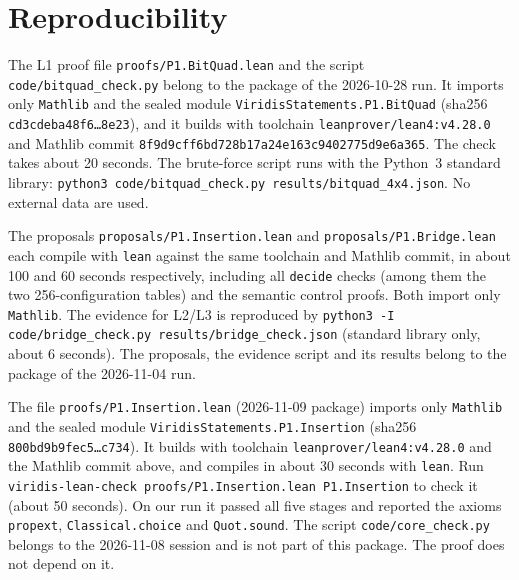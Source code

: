 \documentclass[11pt]{article}
\theoremstyle{definition}
\theoremstyle{remark}
\begin{document}
\section{Reproducibility}
{\sloppy

The L1 proof file \texttt{proofs/P1.BitQuad.lean} and the script
\texttt{code/bitquad\_check.py} belong to the package of the 2026-10-28 run. It imports only
\texttt{Mathlib} and the sealed module \texttt{ViridisStatements.P1.BitQuad}
(sha256 \texttt{cd3cdeba48f6\ldots{}8e23}), and it builds with toolchain
\texttt{leanprover/lean4:v4.28.0} and Mathlib commit
\texttt{8f9d9cff6bd728b17a24e163c9402775d9e6a365}. The check takes about 20
seconds. The brute-force script runs with the Python~3 standard library:
\texttt{python3 code/bitquad\_check.py results/bitquad\_4x4.json}. No external
data are used.

The proposals \texttt{proposals/P1.Insertion.lean} and
\texttt{proposals/P1.Bridge.lean} each compile with \texttt{lean} against the
same toolchain and Mathlib commit, in about 100 and 60 seconds respectively,
including all \texttt{decide} checks (among them the two 256-configuration
tables) and the semantic control proofs. Both import only \texttt{Mathlib}. The evidence
for L2/L3 is reproduced by \texttt{python3 -I code/bridge\_check.py
results/bridge\_check.json} (standard library only, about 6 seconds). The
proposals, the evidence script and its results belong to the package of the
2026-11-04 run.

The file \texttt{proofs/P1.Insertion.lean} (2026-11-09 package) imports only
\texttt{Mathlib} and the sealed module \texttt{ViridisStatements.P1.Insertion}
(sha256 \texttt{800bd9b9fec5\ldots{}c734}). It builds with toolchain
\texttt{leanprover/lean4:v4.28.0} and the Mathlib commit above, and compiles in about
30 seconds with \texttt{lean}. Run
\texttt{viridis-lean-check proofs/P1.Insertion.lean P1.Insertion} to check it
(about 50 seconds). On our run it passed all five stages and reported the axioms
\texttt{propext}, \texttt{Classical.choice} and \texttt{Quot.sound}. The script
\texttt{code/core\_check.py} belongs to the 2026-11-08 session and is not part of
this package. The proof does not depend on it.

}
\end{document}
